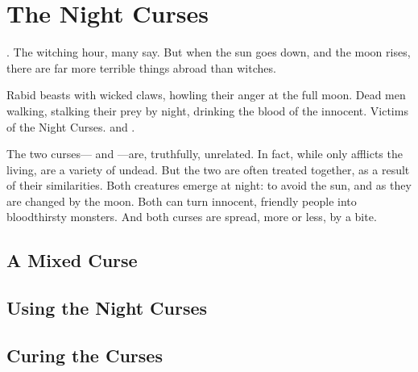 \chapter{The Night Curses}

.
The witching hour, many say.
But when the sun goes down, and the moon rises, there are far more terrible things abroad than witches.

Rabid beasts with wicked claws, howling their anger at the full moon.
Dead men walking, stalking their prey by night, drinking the blood of the innocent.
Victims of the Night Curses.
{\werewolves} and {\vampires}.

The two curses---{\lycanthropy} and {\vampirism}---are, truthfully, unrelated.
In fact, while {\lycanthropy} only afflicts the living, {\vampires} are a variety of undead.
But the two are often treated together, as a result of their similarities.
Both creatures emerge at night: {\vampires} to avoid the sun, and {\werewolves} as they are changed by the moon.
Both can turn innocent, friendly people into bloodthirsty monsters.
And both curses are spread, more or less, by a bite.

\section{A Mixed Curse}



\section{Using the Night Curses}



\section{Curing the Curses}


